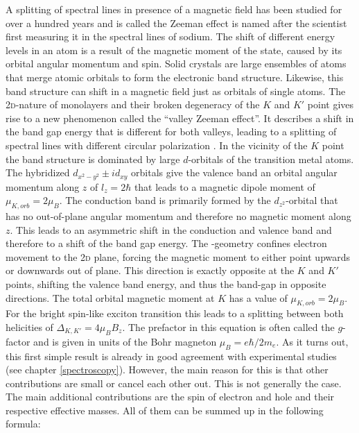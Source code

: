 A splitting of spectral lines in presence of a magnetic field has been studied for over a hundred years and is called the Zeeman effect is named after the scientist first measuring it in the spectral lines of sodium. The shift of different energy levels in an atom is a result of the magnetic moment of the state, caused by its orbital angular momentum and spin. Solid crystals are large ensembles of atoms that merge atomic orbitals to form the electronic band structure. Likewise, this band structure can shift in a magnetic field just as orbitals of single atoms. The 2\textsc{d}-nature of \tmdg monolayers and their broken degeneracy of the $K$ and $K'$ point gives rise to a new phenomenon called the ``valley Zeeman effect''. It describes a shift in the band gap energy that is different for both valleys, leading to a splitting of spectral lines with different circular polarization \cite{srivastava_valley_2015, aivazian_magnetic_2015}. In the vicinity of the $K$ point the band structure is dominated by large $d$-orbitals of the transition metal atoms. The hybridized $d_{x^2-y^2} \pm id_{xy}$ orbitals give the valence band an orbital angular momentum along $z$ of $l_z=2\hbar$ that leads to a magnetic dipole moment of $\mu_{K,orb}=2\mu_B$. The conduction band is primarily formed by the $d_{z^2}$-orbital that has no out-of-plane angular momentum and therefore no magnetic moment along $z$. This leads to an asymmetric shift in the conduction and valence band and therefore to a shift of the band gap energy. The \tmd-geometry confines electron movement to the 2\textsc{d} plane, forcing the magnetic moment to either point upwards or downwards out of plane. This direction is exactly opposite at the $K$ and $K'$ points, shifting the valence band energy, and thus the band-gap in opposite directions. The total orbital magnetic moment at $K$ has a value of $\mu_{K,orb}=2\mu_B$. For the bright spin-like exciton transition this leads to a splitting between both helicities of $\Delta_{K,K'}=4\mu_BB_z$. The prefactor in this equation is often called the $g$-factor and is given in units of the Bohr magneton $\mu_B=e\hbar/2m_e$. As it turns out, this first simple result is already in good agreement with experimental studies (see chapter \ref{spectroscopy}). However, the main reason for this is that other contributions are small or cancel each other out. This is not generally the case. The main additional contributions are the spin of electron and hole and their respective effective masses. %
All of them can be summed up in the following formula:

